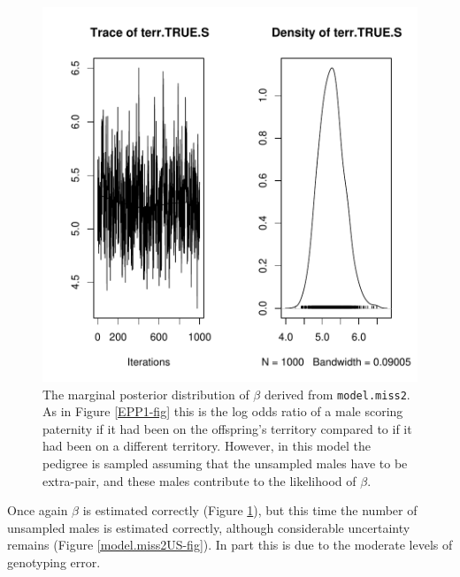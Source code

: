 \documentclass{article}
\begin{document}
\begin{figure}[!h]
\begin{center}
\includegraphics{Tutorial-078}
\end{center}
\caption{The marginal posterior distribution of $\beta$ derived from \texttt{model.miss2}. As in Figure \ref{EPP1-fig} this is the log odds ratio of a male scoring paternity if it had been on the offspring's territory compared to if it had been on a different territory. However, in this model the pedigree is sampled assuming that the unsampled males have to be extra-pair, and these males contribute to the likelihood of $\beta$.}
\label{model.miss2-fig}
\end{figure}

Once again $\beta$ is estimated correctly (Figure \ref{model.miss2-fig}), but this time the number of unsampled males is estimated correctly, although considerable uncertainty remains (Figure \ref{model.miss2US-fig}).  In part this is due to the moderate levels of genotyping error.\\
\end{document}

